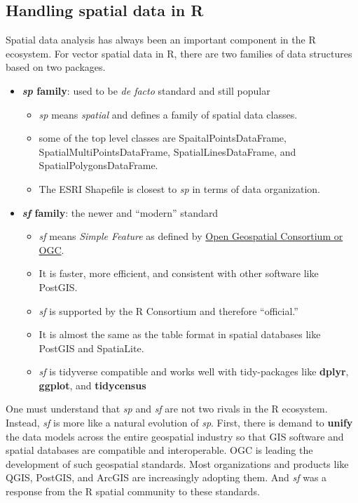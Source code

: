 \documentclass[
  11pt,
]{book}
\providecommand{\tightlist}{%
  \setlength{\itemsep}{0pt}\setlength{\parskip}{0pt}}
\begin{document}
\hypertarget{handling-spatial-data-in-r}{%
\subsection{Handling spatial data in R}\label{handling-spatial-data-in-r}}

Spatial data analysis has always been an important component in the R ecosystem. For vector spatial data in R, there are two families of data structures based on two packages.

\begin{itemize}
\tightlist
\item
  \textbf{\emph{sp} family}: used to be \emph{de facto} standard and still popular

  \begin{itemize}
  \tightlist
  \item
    \emph{sp} means \emph{spatial} and defines a family of spatial data classes.
  \item
    some of the top level classes are SpaitalPointsDataFrame, SpatialMultiPointsDataFrame, SpatialLinesDataFrame, and SpatialPolygonsDataFrame.
  \item
    The ESRI Shapefile is closest to \emph{sp} in terms of data organization.
  \end{itemize}
\item
  \textbf{\emph{sf} family}: the newer and ``modern'' standard

  \begin{itemize}
  \tightlist
  \item
    \emph{sf} means \emph{Simple Feature} as defined by \href{http://www.opengeospatial.org/}{Open Geospatial Consortium or OGC}.
  \item
    It is faster, more efficient, and consistent with other software like PostGIS.
  \item
    \emph{sf} is supported by the R Consortium and therefore ``official.''
  \item
    It is almost the same as the table format in spatial databases like PostGIS and SpatiaLite.
  \item
    \emph{sf} is tidyverse compatible and works well with tidy-packages like \textbf{dplyr}, \textbf{ggplot}, and \textbf{tidycensus}
  \end{itemize}
\end{itemize}

One must understand that \emph{sp} and \emph{sf} are not two rivals in the R ecosystem. Instead, \emph{sf} is more like a natural evolution of \emph{sp}. First, there is demand to \textbf{unify} the data models across the entire geospatial industry so that GIS software and spatial databases are compatible and interoperable. OGC is leading the development of such geospatial standards. Most organizations and products like QGIS, PostGIS, and ArcGIS are increasingly adopting them. And \emph{sf} was a response from the R spatial community to these standards.
\end{document}
